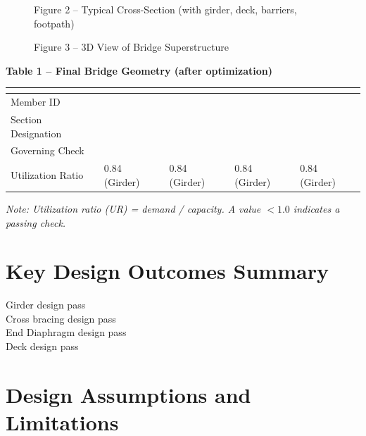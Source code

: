 \documentclass[12pt,a4paper]{report}
\numberwithin{table}{chapter}
\numberwithin{figure}{chapter}
\begin{document}
\newpage

\begin{figure}[H]
\centering
{}
\caption*{Figure 2 -- Typical Cross-Section (with girder, deck, barriers, footpath)}
\end{figure}

\begin{figure}[H]
\centering
{}
\caption*{Figure 3 -- 3D View of Bridge Superstructure}
\end{figure}

\noindent\textbf{Table 1 -- Final Bridge Geometry (after optimization)}

\vspace{0.4em}
\noindent
\begin{tabular}{|C{2.8cm}|C{3.0cm}|C{3.0cm}|C{3.0cm}|C{3.0cm}|}
\hline
  \textbf{} &
  \textbf{} &
  \textbf{} &
  \textbf{} &
  \textbf{} \\
\hline
Member ID &  &  &  &  \\
\hline
Section Designation &  &  &  &  \\
\hline
Governing Check &  &  &  &  \\
\hline
Utilization Ratio & 0.84 (Girder) & 0.84 (Girder) & 0.84 (Girder) & 0.84 (Girder) \\
\hline
\end{tabular}

\vspace{0.4em}
\noindent\textit{Note: Utilization ratio (UR) = demand / capacity. A value $< 1.0$ indicates a passing check.}

\vspace{1em}

\section*{Key Design Outcomes Summary}
\label{sec:key-outcomes}

\noindent Girder design pass \\
Cross bracing design pass \\
End Diaphragm design pass \\
Deck design pass

\section*{Design Assumptions and Limitations}
\label{sec:assumptions}
\end{document}
